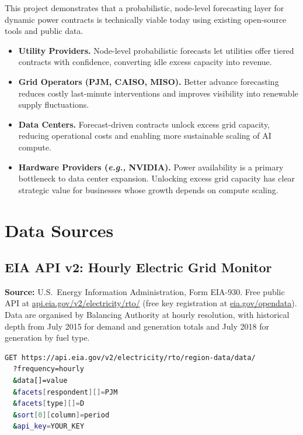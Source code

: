 \documentclass[10pt,letterpaper]{article}
\newcommand{\eg}{\textit{e.g.,}\xspace}
\begin{document}
This project demonstrates that a probabilistic, node-level forecasting layer for dynamic power
contracts is technically viable today using existing open-source tools and public data.

\begin{itemize}
  \item \textbf{Utility Providers.} Node-level probabilistic forecasts let utilities offer tiered
        contracts with confidence, converting idle excess capacity into revenue.
  \item \textbf{Grid Operators (PJM, CAISO, MISO).} Better advance forecasting reduces
        costly last-minute interventions and improves visibility into renewable supply
        fluctuations.
  \item \textbf{Data Centers.} Forecast-driven contracts unlock excess grid capacity, reducing
        operational costs and enabling more sustainable scaling of AI compute.
  \item \textbf{Hardware Providers (\eg NVIDIA).} Power availability is a primary bottleneck
        to data center expansion. Unlocking excess grid capacity has clear strategic value for
        businesses whose growth depends on compute scaling.
\end{itemize}

\appendix
\section{Data Sources}
\label{app:data}

\subsection{EIA API v2: Hourly Electric Grid Monitor}

\textbf{Source:} U.S.\ Energy Information Administration, Form EIA-930. Free public API at
\url{api.eia.gov/v2/electricity/rto/} (free key registration at \url{eia.gov/opendata}). Data
are organised by Balancing Authority at hourly resolution, with historical depth from July 2015
for demand and generation totals and July 2018 for generation by fuel type.

\begin{lstlisting}[language=bash, caption={Example EIA API query for PJM hourly demand.}, label={lst:eia}]
GET https://api.eia.gov/v2/electricity/rto/region-data/data/
  ?frequency=hourly
  &data[]=value
  &facets[respondent][]=PJM
  &facets[type][]=D
  &sort[0][column]=period
  &api_key=YOUR_KEY
\end{lstlisting}
\end{document}
